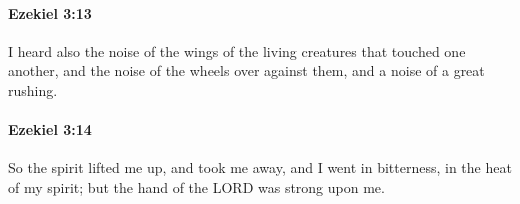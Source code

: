 		\paragraph{Ezekiel 3:13} %
			\label{EZEKIEL-3-13}

			I heard also the noise of the wings of the living creatures that touched one another, and the noise of the wheels over against them, and a noise of a great rushing.


		\paragraph{Ezekiel 3:14} %
			\label{EZEKIEL-3-14}

			So the spirit lifted me up, and took me away, and I went in bitterness, in the heat of my spirit; but the hand of the LORD was strong upon me.


